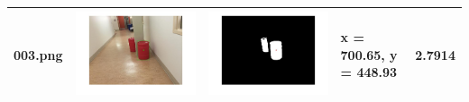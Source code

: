 \documentclass[fleqn,10pt]{SelfArx} %
\begin{document}
\begin{table}
\begin{tabular}{>{\centering\arraybackslash}M{15mm}cc>{\centering\arraybackslash}M{11mm}>{\centering\arraybackslash}M{15mm}}
\vspace{-4cm}003.png & \includegraphics[trim={3cm 2cm 3cm 2cm},clip,scale=0.28]{results/003.jpg} & \includegraphics[trim={3cm 2cm 3cm 2cm},clip,scale=0.28]{results/003s.jpg} & \vspace{-4cm} x = 700.65, y = 448.93 & \vspace{-4cm}2.7914 \\ 
\hline 

\end{tabular}
\end{table}
\end{document}
